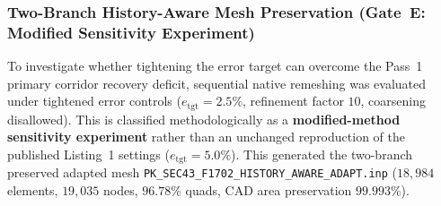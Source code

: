 \subsubsection{Two-Branch History-Aware Mesh Preservation (Gate~E: Modified Sensitivity Experiment)}
To investigate whether tightening the error target can overcome the Pass~1 primary corridor recovery deficit, sequential native remeshing was evaluated under tightened error controls ($e_{\mathrm{tgt}} = 2.5\%$, refinement factor $10$, coarsening disallowed). This is classified methodologically as a \textbf{modified-method sensitivity experiment} rather than an unchanged reproduction of the published Listing~1 settings ($e_{\mathrm{tgt}} = 5.0\%$). This generated the two-branch preserved adapted mesh \texttt{PK\_SEC43\_F1702\_HISTORY\_AWARE\_ADAPT.inp} ($18{,}984$ elements, $19{,}035$ nodes, $96.78\%$ quads, CAD area preservation $99.993\%$).

